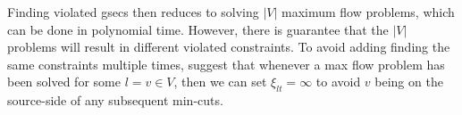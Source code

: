   Finding violated \glspl{gsec} then reduces to solving $|V|$ maximum flow problems, which can be done in polynomial time. However, there is guarantee
  that the $|V|$ problems will result in different violated constraints.
  To avoid adding finding the same constraints multiple times, \citet{lucena2004strong} suggest that whenever a max flow problem has been
  solved for some $l = v \in V$, then we can set $\xi_{lt} = \infty$ to avoid $v$ being on the source-side of any subsequent min-cuts.

